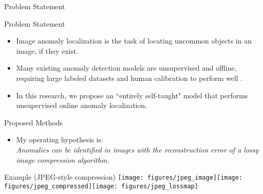\documentclass[10pt]{beamer}
\newcommand{\tabimg}[2]{\begin{tabular}{c}\texttt{[image: \#1]}\end{tabular}}
\begin{document}
\begin{frame}{Problem Statement}
\begin{itemize}
\begin{frame}{Problem Statement}
\begin{itemize}
\item \alert{Image anomaly localization} is the task of locating uncommon objects in an image, if they exist.

\item Many existing anomaly detection models are unsupervised and offline, requiring large labeled datasets and human calibration to perform well \cite{wta_detection, attention_anomalies}.

\item In this research, we propose an ``entirely self-taught" model that performs \alert{unsupervised online anomaly localization}.\\[4mm]



\end{itemize}
\end{frame}

\begin{frame}{Proposed Methods}
\begin{itemize}

\item My operating hypothesis is:\\ 
\alert{\textit{Anomalies can be identified in images with the reconstruction error of a lossy image compression algorithm.}}\\[2cm]
\end{itemize}


\begin{exampleblock}{Example (JPEG-style compression)}
\texttt{[image: figures/jpeg\_image]}\texttt{[image: figures/jpeg\_compressed]}\texttt{[image: figures/jpeg\_lossmap]}
\end{exampleblock}


\end{frame}


\end{itemize}
\end{frame}
\end{document}
